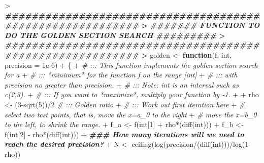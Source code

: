 \documentclass[
]{article}
\newenvironment{Shaded}{\begin{snugshade}}{\end{snugshade}}
\newcommand{\AttributeTok}[1]{\textcolor[rgb]{0.77,0.63,0.00}{#1}}
\newcommand{\CommentTok}[1]{\textcolor[rgb]{0.56,0.35,0.01}{\textit{#1}}}
\newcommand{\ControlFlowTok}[1]{\textcolor[rgb]{0.13,0.29,0.53}{\textbf{#1}}}
\newcommand{\DecValTok}[1]{\textcolor[rgb]{0.00,0.00,0.81}{#1}}
\newcommand{\DocumentationTok}[1]{\textcolor[rgb]{0.56,0.35,0.01}{\textbf{\textit{#1}}}}
\newcommand{\ErrorTok}[1]{\textcolor[rgb]{0.64,0.00,0.00}{\textbf{#1}}}
\newcommand{\FloatTok}[1]{\textcolor[rgb]{0.00,0.00,0.81}{#1}}
\newcommand{\FunctionTok}[1]{\textcolor[rgb]{0.00,0.00,0.00}{#1}}
\newcommand{\NormalTok}[1]{#1}
\newcommand{\OtherTok}[1]{\textcolor[rgb]{0.56,0.35,0.01}{#1}}
\newcommand{\SpecialCharTok}[1]{\textcolor[rgb]{0.00,0.00,0.00}{#1}}
\begin{document}
\begin{Shaded}
\begin{Highlighting}[]
\SpecialCharTok{\textgreater{}} \DocumentationTok{\#\#\#\#\#\#\#\#\#\#\#\#\#\#\#\#\#\#\#\#\#\#\#\#\#\#\#\#\#\#\#\#\#\#\#\#\#\#\#\#\#\#\#\#\#\#\#\#\#\#\#\#\#\#\#\#\#\#}
\ErrorTok{\textgreater{}} \DocumentationTok{\#\#\#\#\#\#\# FUNCTION TO DO THE GOLDEN SECTION SEARCH \#\#\#\#\#\#\#\#\#}
\ErrorTok{\textgreater{}} \DocumentationTok{\#\#\#\#\#\#\#\#\#\#\#\#\#\#\#\#\#\#\#\#\#\#\#\#\#\#\#\#\#\#\#\#\#\#\#\#\#\#\#\#\#\#\#\#\#\#\#\#\#\#\#\#\#\#\#\#\#\#}
\ErrorTok{\textgreater{}}\NormalTok{ golden }\OtherTok{\textless{}{-}} \ControlFlowTok{function}\NormalTok{(f, int, }\AttributeTok{precision =} \FloatTok{1e{-}6}\NormalTok{)}
\SpecialCharTok{+}\NormalTok{ \{}
\SpecialCharTok{+}   \CommentTok{\# ::: This function implements the golden section search for a }
\SpecialCharTok{+}   \CommentTok{\# ::: *minimum* for the function \textquotesingle{}f\textquotesingle{} on the range [int]}
\SpecialCharTok{+}   \CommentTok{\# ::: with precision no greater than \textquotesingle{}precision\textquotesingle{}.}
\SpecialCharTok{+}   \CommentTok{\# ::: Note: \textquotesingle{}int\textquotesingle{} is an interval such as c(2,3).}
\SpecialCharTok{+}   \CommentTok{\# ::: If you want to *maximize*, multiply your function by {-}1.}
\SpecialCharTok{+}   
\SpecialCharTok{+}\NormalTok{   rho }\OtherTok{\textless{}{-}}\NormalTok{ (}\DecValTok{3}\SpecialCharTok{{-}}\FunctionTok{sqrt}\NormalTok{(}\DecValTok{5}\NormalTok{))}\SpecialCharTok{/}\DecValTok{2} \CommentTok{\# ::: Golden ratio}
\SpecialCharTok{+}   \CommentTok{\# ::: Work out first iteration here}
\SpecialCharTok{+}   \CommentTok{\# select two test points, that is, move the x=a\_0 to the right}
\SpecialCharTok{+}   \CommentTok{\# move the x=b\_0 to the left, to shrink the range.}
\SpecialCharTok{+}\NormalTok{   f\_a }\OtherTok{\textless{}{-}} \FunctionTok{f}\NormalTok{(int[}\DecValTok{1}\NormalTok{] }\SpecialCharTok{+}\NormalTok{ rho}\SpecialCharTok{*}\NormalTok{(}\FunctionTok{diff}\NormalTok{(int)))}
\SpecialCharTok{+}\NormalTok{   f\_b }\OtherTok{\textless{}{-}} \FunctionTok{f}\NormalTok{(int[}\DecValTok{2}\NormalTok{] }\SpecialCharTok{{-}}\NormalTok{ rho}\SpecialCharTok{*}\NormalTok{(}\FunctionTok{diff}\NormalTok{(int)))}
\SpecialCharTok{+}   \DocumentationTok{\#\#\# How many iterations will we need to reach the desired precision?}
\SpecialCharTok{+}\NormalTok{   N }\OtherTok{\textless{}{-}} \FunctionTok{ceiling}\NormalTok{(}\FunctionTok{log}\NormalTok{(precision}\SpecialCharTok{/}\NormalTok{(}\FunctionTok{diff}\NormalTok{(int)))}\SpecialCharTok{/}\FunctionTok{log}\NormalTok{(}\DecValTok{1}\SpecialCharTok{{-}}\NormalTok{rho))}

\end{Highlighting}
\end{Shaded}
\end{document}
